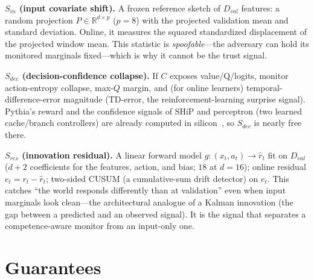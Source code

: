 \documentclass{article}
\begin{document}
\textbf{$S_{in}$ (input covariate shift).} A frozen reference sketch of $D_{val}$
features: a random projection $P\in\mathbb{R}^{d\times p}$ ($p{=}8$) with the
projected validation mean and standard deviation. Online, it measures the squared
standardized displacement of the projected window mean. This statistic is
\emph{spoofable}---the adversary can hold its monitored marginals fixed---which is
why it cannot be the trust signal.

\textbf{$S_{dec}$ (decision-confidence collapse).} If $C$ exposes value/Q/logits,
monitor action-entropy collapse, max-$Q$ margin, and (for online learners)
temporal-difference-error magnitude (TD-error, the reinforcement-learning surprise signal). Pythia's reward and the confidence signals of SHiP and perceptron (two learned cache/branch controllers) are already computed in silicon~\citep{wu2011ship,jimenez2001perceptron}, so $S_{dec}$ is
nearly free there.

\textbf{$S_{res}$ (innovation residual).} A linear forward model
$g:(x_t,a_t)\to\hat r_t$ fit on $D_{val}$ ($d+2$ coefficients for the features,
action, and bias; $18$ at $d{=}16$); online residual $e_t=r_t-\hat r_t$;
two-sided CUSUM (a cumulative-sum drift detector) on $e_t$. This catches ``the world responds differently than at
validation'' even when input marginals look clean---the architectural analogue of
a Kalman innovation (the gap between a predicted and an observed signal). It is the signal that separates a competence-aware monitor
from an input-only one.

\section{Guarantees}\label{sec:guarantees}
\end{document}
